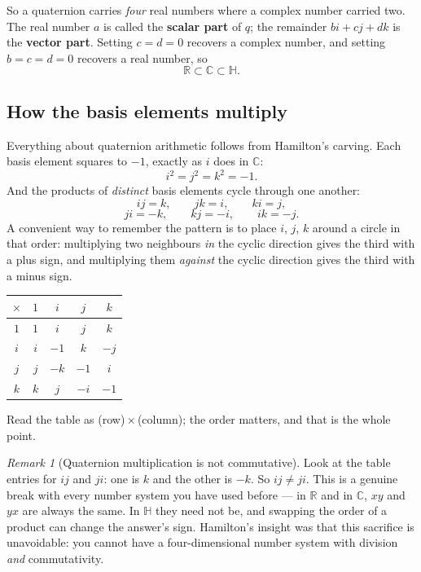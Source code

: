 \documentclass[11pt]{article}
\theoremstyle{definition}
\theoremstyle{remark}
\newtheorem*{rmk}{Remark}
\newcommand{\R}{\mathbb{R}}
\newcommand{\C}{\mathbb{C}}
\newcommand{\Hq}{\mathbb{H}}
\begin{document}
\noindent So a quaternion carries \emph{four} real numbers where a complex
number carried two. The real number $a$ is called the \textbf{scalar part} of
$q$; the remainder $bi+cj+dk$ is the \textbf{vector part}. Setting
$c=d=0$ recovers a complex number, and setting $b=c=d=0$ recovers a real number,
so
\[
  \R\subset\C\subset\Hq .
\]

\subsection{How the basis elements multiply}
Everything about quaternion arithmetic follows from Hamilton's carving. Each
basis element squares to $-1$, exactly as $i$ does in $\C$:
\[
  i^{2}=j^{2}=k^{2}=-1 .
\]
And the products of \emph{distinct} basis elements cycle through one another:
\[
  ij=k, \qquad jk=i, \qquad ki=j ,
\]
\[
  ji=-k, \qquad kj=-i, \qquad ik=-j .
\]
A convenient way to remember the pattern is to place $i$, $j$, $k$ around a
circle in that order: multiplying two neighbours \emph{in} the cyclic direction
gives the third with a plus sign, and multiplying them \emph{against} the cyclic
direction gives the third with a minus sign.

\begin{center}
\renewcommand{\arraystretch}{1.35}
\begin{tabular}{@{}c|cccc@{}}
\toprule
$\times$ & $1$ & $i$ & $j$ & $k$ \\
\midrule
$1$ & $1$ & $i$  & $j$  & $k$  \\
$i$ & $i$ & $-1$ & $k$  & $-j$ \\
$j$ & $j$ & $-k$ & $-1$ & $i$  \\
$k$ & $k$ & $j$  & $-i$ & $-1$ \\
\bottomrule
\end{tabular}
\end{center}

\noindent Read the table as (row)\,$\times$\,(column); the order matters, and
that is the whole point.

\begin{rmk}[Quaternion multiplication is not commutative]
Look at the table entries for $ij$ and $ji$: one is $k$ and the other is $-k$.
So $ij\neq ji$. This is a genuine break with every number system you have used
before --- in $\R$ and in $\C$, $xy$ and $yx$ are always the same. In $\Hq$ they
need not be, and swapping the order of a product can change the answer's sign.
Hamilton's insight was that this sacrifice is unavoidable: you cannot have a
four-dimensional number system with division \emph{and} commutativity.
\end{rmk}
\end{document}
